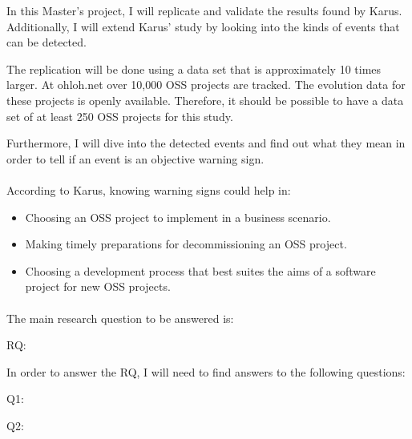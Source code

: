 In this Master's project, I will replicate and validate the results found by
Karus. Additionally, I will extend Karus' study by looking into the kinds of
events that can be detected.

The replication will be done using a data set that is approximately 10 times
larger. At ohloh.net over 10,000 OSS projects are tracked. The evolution data
for these projects is openly available. Therefore, it should be possible to
have a data set of at least 250 OSS projects for this study.

Furthermore, I will dive into the detected events and find out what they mean
in order to tell if an event is an objective warning sign.

\paragraph{}
According to Karus, knowing warning signs could help in:
\begin{itemize}
	\item Choosing an OSS project to implement in a business scenario.
	\item Making timely preparations for decommissioning an OSS project.
	\item Choosing a development process that best suites the aims of a software
	project for new OSS projects.
\end{itemize}

\paragraph{}
The main research question to be answered is:
\begin{description}
	\item[RQ:] \emph{\researchQuestion} \cite{karus2013}
\end{description}

In order to answer the RQ, I will need to find answers to the following
questions:
\begin{description}
	\item[Q1:] \emph{\subQuestionOne}
	\item[Q2:] \emph{\subQuestionTwo}
\end{description}
